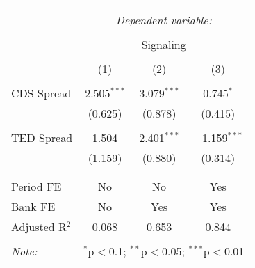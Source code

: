 
\begin{table}[!htbp] \centering 
  \caption{} 
  \label{} 
\begin{tabular}{@{\extracolsep{5pt}}lccc} 
\\[-1.8ex]\hline 
\hline \\[-1.8ex] 
 & \multicolumn{3}{c}{\textit{Dependent variable:}} \\ 
\cline{2-4} 
\\[-1.8ex] & \multicolumn{3}{c}{Signaling} \\ 
\\[-1.8ex] & (1) & (2) & (3)\\ 
\hline \\[-1.8ex] 
 CDS Spread & 2.505$^{***}$ & 3.079$^{***}$ & 0.745$^{*}$ \\ 
  & (0.625) & (0.878) & (0.415) \\ 
  & & & \\ 
 TED Spread & 1.504 & 2.401$^{***}$ & $-$1.159$^{***}$ \\ 
  & (1.159) & (0.880) & (0.314) \\ 
  & & & \\ 
\hline \\[-1.8ex] 
Period FE & No & No & Yes \\ 
Bank FE & No & Yes & Yes \\ 
Adjusted R$^{2}$ & 0.068 & 0.653 & 0.844 \\ 
\hline 
\hline \\[-1.8ex] 
\textit{Note:}  & \multicolumn{3}{r}{$^{*}$p$<$0.1; $^{**}$p$<$0.05; $^{***}$p$<$0.01} \\ 
\end{tabular} 
\end{table} 
